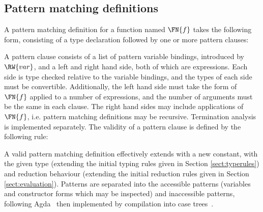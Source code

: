\DM{
\AR{
\Data\hg\Vect\Hab\Nat\to(\va\Hab\Type)\to\Type\hg\Where \\
\hg\hg\ARd{
& \nil\Hab\Vect\;\Z\;\va\\
\mid & (\cons)\Hab\fbind{\vk}{\Nat}{
\fbind{\vx}{\va}{\fbind{\vxs}{\Vect\;\vk\;\va}{\Vect\;(\suc\;\vk)\;\va}}
}
}
}
}

\subsection{Pattern matching definitions}

\label{sect:patdefs}



A pattern matching definition for a function named $\FN{f}$ takes the following form,
consisting of a type declaration followed by one or more pattern clauses:


A pattern clause consists of a list of pattern variable bindings, introduced by
$\RW{var}$,
and a left and right hand side, both of which
are \TT{} expressions. Each side is type checked relative to the variable bindings,
and the types of each side must be convertible. Additionally, the
left hand side must take the form of $\FN{f}$ applied to a number of \TT{} expressions,
and the number of arguments must be the same in each clause. The right hand
sides may include applications of $\FN{f}$, i.e. pattern matching definitions may
be recursive. Termination analysis is implemented separately. The validity of a pattern
clause is defined by the following rule:


A valid pattern matching definition effectively extends \TT{} with a new
constant, with the given type (extending the initial typing rules given in
Section \ref{sect:typerules}) and reduction behaviour (extending the initial
reduction rules given in Section \ref{sect:evaluation}). 
Patterns are separated into the accessible patterns (variables and constructor
forms which may be inspected) and inaccessible patterns, following
Agda~\cite{norell2007thesis} then implemented by compilation into case
trees~\cite{Augustsson1985}.

